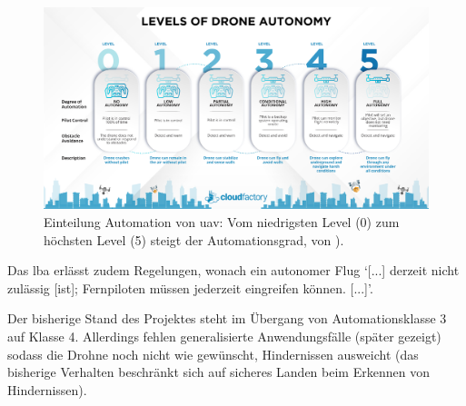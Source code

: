 \begin{figure}[!h]
	\includegraphics[width=\linewidth]{images/drone_autonomy_levels.png}
	\caption{Einteilung Automation von \gls{uav}: Vom niedrigsten Level (0) zum höchsten Level (5) steigt der Automationsgrad, von \cite{cloudfactoryBreakingLevelsDrone}).}
	\label{fig:automation_levels}
	\end{figure}

Das \gls{lba} erlässt zudem Regelungen, wonach ein autonomer Flug \enquote*{[...] derzeit nicht zulässig [ist]; Fernpiloten müssen jederzeit eingreifen können. [...]}\cite{openuavadminDatenverbindungUndFlugmodi}.  

Der bisherige Stand des Projektes steht im Übergang von Automationsklasse 3 auf Klasse 4. Allerdings fehlen generalisierte Anwendungsfälle (später gezeigt) sodass die Drohne noch nicht wie gewünscht, Hindernissen ausweicht (das bisherige Verhalten beschränkt sich auf sicheres Landen beim Erkennen von Hindernissen).


%
%
%

